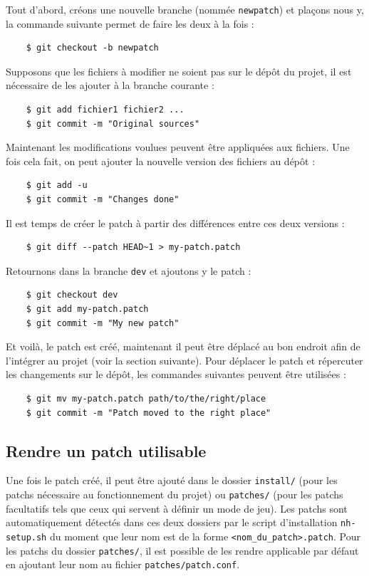 \documentclass[10pt,a4paper]{report}
\begin{document}
Tout d'abord, créons une nouvelle branche (nommée \verb!newpatch!) et plaçons nous y, la commande
suivante permet de faire les deux à la fois :
\begin{verbatim}
    $ git checkout -b newpatch
\end{verbatim}

Supposons que les fichiers à modifier ne soient pas sur le dépôt du projet, il
est nécessaire de les ajouter à la branche courante :
\begin{verbatim}
    $ git add fichier1 fichier2 ...
    $ git commit -m "Original sources"
\end{verbatim}

Maintenant les modifications voulues peuvent être appliquées aux fichiers. Une
fois cela fait, on peut ajouter la nouvelle version des fichiers au dépôt :
\begin{verbatim}
    $ git add -u
    $ git commit -m "Changes done"
\end{verbatim}

Il est temps de créer le patch à partir des différences entre ces deux
versions :
\begin{verbatim}
    $ git diff --patch HEAD~1 > my-patch.patch
\end{verbatim}

Retournons dans la branche \verb!dev! et ajoutons y le patch :
\begin{verbatim}
    $ git checkout dev
    $ git add my-patch.patch
    $ git commit -m "My new patch"
\end{verbatim}

Et voilà, le patch est créé, maintenant il peut être déplacé au bon endroit
afin de l'intégrer au projet (voir la section suivante).
Pour déplacer le patch et répercuter les changements sur le dépôt, les
commandes suivantes peuvent être utilisées :
\begin{verbatim}
    $ git mv my-patch.patch path/to/the/right/place
    $ git commit -m "Patch moved to the right place"
\end{verbatim}

\subsection{Rendre un patch utilisable}

Une fois le patch créé, il peut être ajouté dans le dossier \verb!install/!
(pour les patchs nécessaire au fonctionnement du projet) ou \verb!patches/!
(pour les patchs facultatifs tels que ceux qui servent à définir un mode de
jeu).
Les patchs sont automatiquement détectés dans ces deux dossiers par le script
d'installation \verb!nh-setup.sh! du moment que leur nom est de la forme
\verb!<nom_du_patch>.patch!. Pour les patchs du dossier \verb!patches/!, il
est possible de les rendre applicable par défaut en ajoutant leur nom au
fichier \verb!patches/patch.conf!. 
\end{document}
